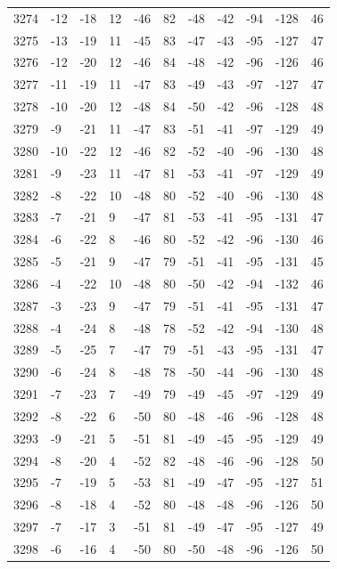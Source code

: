 \begin{table}[H]
\begin{tabular}{lllllllllll}
3274 & -12 & -18 & 12 & -46 & 82 & -48 & -42 & -94 & -128 & 46 \\
3275 & -13 & -19 & 11 & -45 & 83 & -47 & -43 & -95 & -127 & 47 \\
3276 & -12 & -20 & 12 & -46 & 84 & -48 & -42 & -96 & -126 & 46 \\
3277 & -11 & -19 & 11 & -47 & 83 & -49 & -43 & -97 & -127 & 47 \\
3278 & -10 & -20 & 12 & -48 & 84 & -50 & -42 & -96 & -128 & 48 \\
3279 & -9 & -21 & 11 & -47 & 83 & -51 & -41 & -97 & -129 & 49 \\
3280 & -10 & -22 & 12 & -46 & 82 & -52 & -40 & -96 & -130 & 48 \\
3281 & -9 & -23 & 11 & -47 & 81 & -53 & -41 & -97 & -129 & 49 \\
3282 & -8 & -22 & 10 & -48 & 80 & -52 & -40 & -96 & -130 & 48 \\
3283 & -7 & -21 & 9 & -47 & 81 & -53 & -41 & -95 & -131 & 47 \\
3284 & -6 & -22 & 8 & -46 & 80 & -52 & -42 & -96 & -130 & 46 \\
3285 & -5 & -21 & 9 & -47 & 79 & -51 & -41 & -95 & -131 & 45 \\
3286 & -4 & -22 & 10 & -48 & 80 & -50 & -42 & -94 & -132 & 46 \\
3287 & -3 & -23 & 9 & -47 & 79 & -51 & -41 & -95 & -131 & 47 \\
3288 & -4 & -24 & 8 & -48 & 78 & -52 & -42 & -94 & -130 & 48 \\
3289 & -5 & -25 & 7 & -47 & 79 & -51 & -43 & -95 & -131 & 47 \\
3290 & -6 & -24 & 8 & -48 & 78 & -50 & -44 & -96 & -130 & 48 \\
3291 & -7 & -23 & 7 & -49 & 79 & -49 & -45 & -97 & -129 & 49 \\
3292 & -8 & -22 & 6 & -50 & 80 & -48 & -46 & -96 & -128 & 48 \\
3293 & -9 & -21 & 5 & -51 & 81 & -49 & -45 & -95 & -129 & 49 \\
3294 & -8 & -20 & 4 & -52 & 82 & -48 & -46 & -96 & -128 & 50 \\
3295 & -7 & -19 & 5 & -53 & 81 & -49 & -47 & -95 & -127 & 51 \\
3296 & -8 & -18 & 4 & -52 & 80 & -48 & -48 & -96 & -126 & 50 \\
3297 & -7 & -17 & 3 & -51 & 81 & -49 & -47 & -95 & -127 & 49 \\
3298 & -6 & -16 & 4 & -50 & 80 & -50 & -48 & -96 & -126 & 50 \\

\end{tabular}
\end{table}
